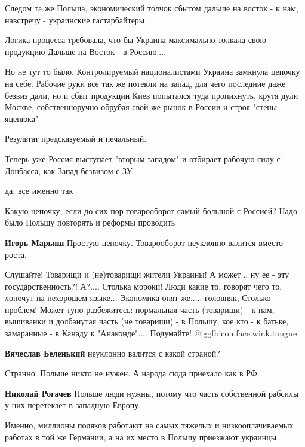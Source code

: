 \begin{itemize}
Следом та же Польша, экономический толчок сбытом дальше на восток - к нам,
навстречу - украинские гастарбайтеры.

Логика процесса требовала, что бы Украина максимально толкала свою продукцию
Дальше на Восток - в Россию....

Но не тут то было. Контролируемый националистами Украина замкнула цепочку на
себе. Рабочие руки все так же потекли на запад, для чего последние даже безвиз
дали, но и сбыт продукции Киев попытался туда пропихнуть, крутя дули Москве,
собственноручно обрубая свой же рынок в России и строя "стены яценюка"

Результат предсказуемый и печальный.

Теперь уже Россия выступает "вторым западом" и отбирает рабочую силу с
Донбасса, как Запад безвизом с ЗУ

\begin{itemize} %
да, все именно так

Какую цепочку, если до сих пор товарооборот самый большой с Россией? Надо было Польшу повторять и реформы проводить

\textbf{Игорь Марьяш}
Простую цепочку.
Товарооборот неуклонно валится вместо роста.

Слушайте!
Товарищи и (не)товарищи жители Украины!
А может... ну ее - эту государственность?!
А?....
Столька мороки!
Люди какие то, говорят чего то, лопочут на нехорошем языке...
Экономика опят же..... головняк,
Столько проблем!
Может тупо разбежитесь: нормальная часть (товарищи) - к нам, вышиванки и долбанутая часть (не товарищи) - в Польшу, кое кто - к батьке, замаранные - в Канаду к "Анаконде"....
Подумайте!  @igg{fbicon.face.wink.tongue} 

\textbf{Вячеслав Беленький} неуклонно валится с какой страной?
\end{itemize} %

Странно. Польше никто не нужен. А народа сюда приехало как в РФ.

\begin{itemize} %
\textbf{Николай Рогачев} Польше люди нужны, потому что часть собственной рабсилы у них перетекает в западную Европу.

Именно, миллионы поляков работают на самых тяжелых и низкооплачиваемых работах в той же Германии, а на их место в Польшу приезжают украинцы.


\end{itemize}
\end{itemize}
